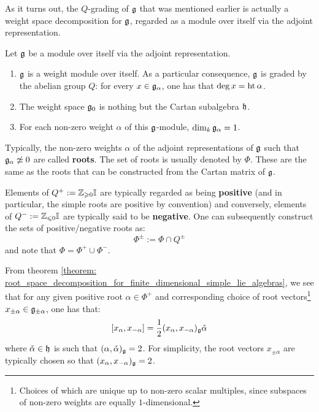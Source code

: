         As it turns out, the $Q$-grading of $\mathfrak{g}$ that was mentioned earlier is actually a weight space decomposition for $\mathfrak{g}$, regarded as a module over itself via the adjoint representation.
        \begin{theorem} \label{theorem: root_space_decomposition_for_finite_dimensional_simple_lie_algebras}
            Let $\mathfrak{g}$ be a module over itself via the adjoint representation.
            \begin{enumerate}
                \item $\mathfrak{g}$ is a weight module over itself. As a particular consequence, $\mathfrak{g}$ is graded by the abelian group $Q$: for every $x \in \mathfrak{g}_{\alpha}$, one has that $\deg x = \operatorname{ht} \alpha$.
                \item The weight space $\mathfrak{g}_0$ is nothing but the Cartan subalgebra $\mathfrak{h}$.
                \item For each non-zero weight $\alpha$ of this $\mathfrak{g}$-module, $\dim_k \mathfrak{g}_{\alpha} = 1$.
            \end{enumerate}
        \end{theorem}
        Typically, the non-zero weights $\alpha$ of the adjoint representations of $\mathfrak{g}$ such that $\mathfrak{g}_{\alpha} \not \simeq 0$ are called \textbf{roots}. The set of roots is usually denoted by $\Phi$. These are the same as the roots that can be constructed from the Cartan matrix of $\mathfrak{g}$.

        Elements of $Q^+ := \mathbb{Z}_{\geqslant 0} \mathbb{I}$ are typically regarded as being \textbf{positive} (and in particular, the simple roots are positive by convention) and conversely, elements of $Q^- := \mathbb{Z}_{\leqslant 0} \mathbb{I}$ are typically said to be \textbf{negative}. One can subsequently construct the sets of positive/negative roots as:
            $$\Phi^{\pm} := \Phi \cap Q^{\pm}$$
        and note that $\Phi = \Phi^+ \cup \Phi^-$.

        From theorem \ref{theorem: root_space_decomposition_for_finite_dimensional_simple_lie_algebras}, we see that for any given positive root $\alpha \in \Phi^+$ and corresponding choice of root vectors\footnote{Choices of which are unique up to non-zero scalar multiples, since subspaces of non-zero weights are equally $1$-dimensional.} $x_{\pm\alpha} \in \mathfrak{g}_{\pm\alpha}$, one has that:
            $$[x_{\alpha}, x_{-\alpha}] = \frac12 (x_{\alpha}, x_{-\alpha})_{\mathfrak{g}} \check{\alpha}$$
        where $\check{\alpha} \in \mathfrak{h}$ is such that $(\alpha, \check{\alpha})_{\mathfrak{g}} = 2$. For simplicity, the root vectors $x_{\pm \alpha}$ are typically chosen so that $(x_{\alpha}, x_{-\alpha})_{\mathfrak{g}} = 2$.
        
